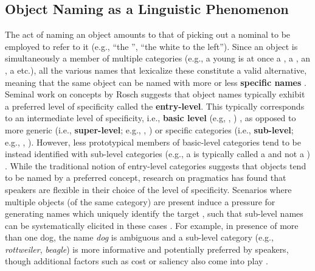 \subsection{Object Naming as a Linguistic Phenomenon}

The act of naming an object amounts to that of picking out a nominal to be employed to refer to it (e.g., ``the '', ``the white  to the left'').
Since an object is simultaneously a member of multiple categories (e.g., a young  is at once a , a , an , a  etc.), all the various names that lexicalize these constitute a valid alternative, meaning that the same object can be named with more or less \textbf{specific names} \cite{brown1958shall,murphy2004big}. 
Seminal work on concepts by Rosch suggests that object names typically exhibit a preferred level of specificity called the \textbf{entry-level}. This typically corresponds to an intermediate level of specificity, i.e., \textbf{basic level} (e.g, , ) \cite{rosch1976basic}, as opposed to more generic (i.e., \textbf{super-level}; e.g., , ) or specific categories (i.e., \textbf{sub-level}; e.g., , ). However, less prototypical members of basic-level categories tend to be instead identified with sub-level categories (e.g., a  is typically called a  and not a ) \cite{jolicoeur1984pictures}. 
While the traditional notion of entry-level categories suggests that objects tend to be named by a  preferred concept, research on pragmatics has found that speakers are flexible in  
their choice of the level of specificity. 
Scenarios where multiple objects (of the same category) are present induce a pressure for generating names which uniquely identify the target \cite{olson1970language}, such that sub-level names can be systematically elicited in these cases %
\cite{rohde2012communicating}\cite{graf2016animal}.
For example, in presence of more than one dog, the name \textsl{dog} is ambiguous and a sub-level category (e.g., \textsl{rottweiler}, \textsl{beagle}) is more informative and potentially preferred by speakers, though additional factors such as cost or saliency also come into play \cite{graf2016animal}\cite{clark1983common}.

